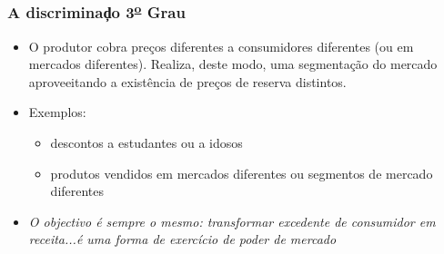 \begin{frame}
	\frametitle{A discrimina\c do 3\textsuperscript{\underline{o}} Grau}
	\begin{itemize}
		\setlength{\itemsep}{1.5em}
		\item O produtor cobra pre\c cos diferentes a consumidores diferentes (ou em mercados diferentes). Realiza, deste modo, uma segmenta\c c\~ao do mercado aproveeitando a exist\^encia de pre\c cos de reserva distintos.
		\item Exemplos:
		\begin{itemize}
			\item descontos a estudantes ou a idosos
			\item produtos vendidos em mercados diferentes ou segmentos de mercado diferentes
		\end{itemize}
		\item \emph{O objectivo \'e sempre o mesmo: transformar excedente de consumidor em receita...\'e uma forma de exerc\'icio de poder de mercado}
	\end{itemize}
\end{frame}